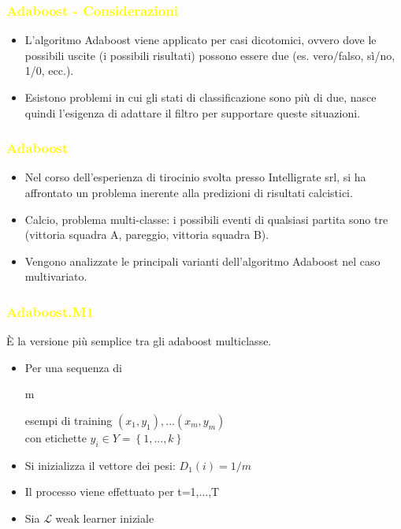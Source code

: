 \documentclass[handout
]{beamer}
\def\yellow#1{{\textcolor{yellow}{#1}}}
\begin{document}
\begin{frame}
\frametitle{\yellow{Adaboost - Considerazioni}}
\begin{itemize}
 \item L'algoritmo Adaboost viene applicato per casi dicotomici, ovvero dove le possibili uscite (i possibili risultati)
possono essere due (es. vero/falso, s\`i/no, 1/0, ecc.).
\item Esistono problemi in cui gli stati di classificazione sono pi\`u di due, 
nasce quindi l'esigenza di adattare il filtro per supportare queste situazioni.
\end{itemize}
\end{frame}

\begin{frame}
\frametitle{\yellow{Adaboost}}
\begin{itemize}
 \item Nel corso dell'esperienza di tirocinio svolta presso Intelligrate srl, 
 si ha affrontato un problema inerente alla predizioni di risultati calcistici.
\item Calcio, problema multi-classe: i possibili eventi di qualsiasi partita sono tre 
(vittoria squadra A, pareggio, vittoria squadra B).
\item Vengono analizzate le principali varianti dell'algoritmo Adaboost nel caso 
multivariato.
\end{itemize}
\end{frame}

\begin{frame}
\frametitle{\yellow{Adaboost.M1}}
\`E la versione pi\`u semplice tra gli adaboost multiclasse.
\begin{itemize}
\item Per una sequenza di \begin{it}m\end{it} esempi di training 
\begin{math}(x_1,y_1), ... (x_m,y_m)\end{math}\\
con etichette \begin{math}y_i\in Y = \left\{1, ..., k\right\}\end{math}
\item Si inizializza il vettore dei pesi: \begin{math} D_1(i)=1/m \end{math}
\item Il processo viene effettuato per t=1,...,T
\item Sia \begin{math} \mathcal{L} \end{math} weak learner iniziale
\end{itemize}

\end{frame}
\end{document}
